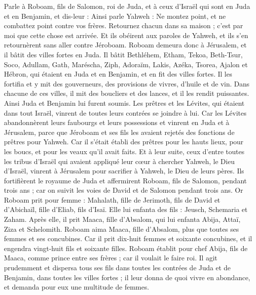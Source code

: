 \begin{multicols}{2}
Parle à Roboam, fils de Salomon, roi de Juda, et à ceux d'Israël qui sont en Juda et en Benjamin, et dis-leur :
Ainsi parle Yahweh : Ne montez point, et ne combattez point contre vos frères. Retournez chacun dans sa maison ; c'est par moi que cette chose est arrivée. Et ils obéirent aux paroles de Yahweh, et ils s'en retournèrent sans aller contre Jéroboam.
Roboam demeura donc à Jérusalem, et il bâtit des villes fortes en Juda.
Il bâtit Bethléhem, Etham, Tekoa,
Beth-Tsur, Soco, Adullam,
Gath, Maréscha, Ziph,
Adoraïm, Lakis, Azéka,
Tsorea, Ajalon et Hébron, qui étaient en Juda et en Benjamin, et en fit des villes fortes.
Il les fortifia et y mit des gouverneurs, des provisions de vivres, d'huile et de vin.
Dans chacune de ces villes, il mit des boucliers et des lances, et il les rendit puissantes. Ainsi Juda et Benjamin lui furent soumis.
Les prêtres et les Lévites, qui étaient dans tout Israël, vinrent de toutes leurs contrées se joindre à lui.
Car les Lévites abandonnèrent leurs faubourgs et leurs possessions et vinrent en Juda et à Jérusalem, parce que Jéroboam et ses fils les avaient rejetés des fonctions de prêtres pour Yahweh.
Car il s'était établi des prêtres pour les hauts lieux, pour les boucs, et pour les veaux qu'il avait faits.
Et à leur suite, ceux d'entre toutes les tribus d'Israël qui avaient appliqué leur cœur à chercher Yahweh, le Dieu d'Israël, vinrent à Jérusalem pour sacrifier à Yahweh, le Dieu de leurs pères.
Ils fortifièrent le royaume de Juda et affermirent Roboam, fils de Salomon, pendant trois ans ; car on suivit les voies de David et de Salomon pendant trois ans.
Or Roboam prit pour femme : Mahalath, fille de Jerimoth, fils de David et d'Abichaïl, fille d'Eliab, fils d'Isaï.
Elle lui enfanta des fils : Jeusch, Schemaria et Zaham.
Après elle, il prit Maaca, fille d'Absalom, qui lui enfanta Abija, Attaï, Ziza et Schelomith.
Roboam aima Maaca, fille d'Absalom, plus que toutes ses femmes et ses concubines. Car il prit dix-huit femmes et soixante concubines, et il engendra vingt-huit fils et soixante filles.
Roboam établit pour chef Abija, fils de Maaca, comme prince entre ses frères ; car il voulait le faire roi.
Il agit prudemment et dispersa tous ses fils dans toutes les contrées de Juda et de Benjamin, dans toutes les villes fortes ; il leur donna de quoi vivre en abondance, et demanda pour eux une multitude de femmes.

\end{multicols}

